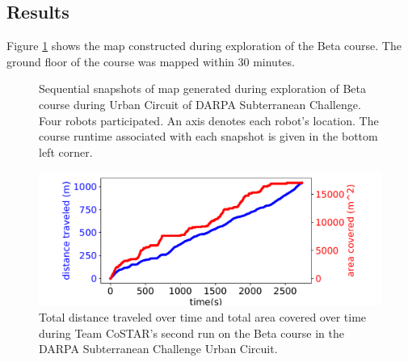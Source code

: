 \documentclass[letterpaper, 10 pt, conference]{ieeeconf}  %
\begin{document}
\subsection{Results}

Figure \ref{fig:beta_map} shows the map constructed during exploration of the Beta course. The ground floor of the course was mapped within 30 minutes.  

\begin{figure}[h!]
\centering
\caption{Sequential snapshots of map generated during exploration of Beta course during Urban Circuit of DARPA Subterranean Challenge. Four robots participated. An axis denotes each robot's location. The course runtime associated with each snapshot is given in the bottom left corner.} \label{fig:beta_map} 
\end{figure}


\begin{figure}[ht!]
  \includegraphics[width=.48\textwidth]{figures/dist_traveled.pdf}
  \centering
  \caption{Total distance traveled over time and total area covered over time during Team CoSTAR's second run on the Beta course in the DARPA Subterranean Challenge Urban Circuit.}
  \label{fig:dist_traveled}
\end{figure}
\end{document}
